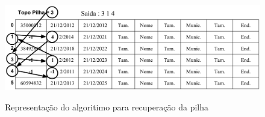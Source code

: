 \documentclass[
	12pt,				%
	openany,			%
	twoside,			%
	a4paper,			%
	english,			%
	french,				%
	spanish,			%
	brazil,				%
]{abntex2}
\begin{document}
		\begin{figure}[ht]
			\centering
			\caption{Representação do algoritimo para recuperação da pilha}
			\includegraphics[width=\textwidth]{func9.png}
			\label{fig:func9}
		\end{figure}
\end{document}
